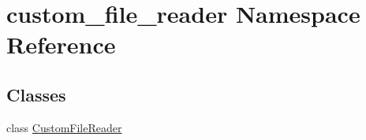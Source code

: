 \hypertarget{namespacecustom__file__reader}{\section{custom\-\_\-file\-\_\-reader Namespace Reference}
\label{namespacecustom__file__reader}
}
\subsection*{Classes}
\begin{DoxyCompactItemize}
\item 
class \hyperlink{classcustom__file__reader_1_1_custom_file_reader}{Custom\-File\-Reader}
\end{DoxyCompactItemize}
